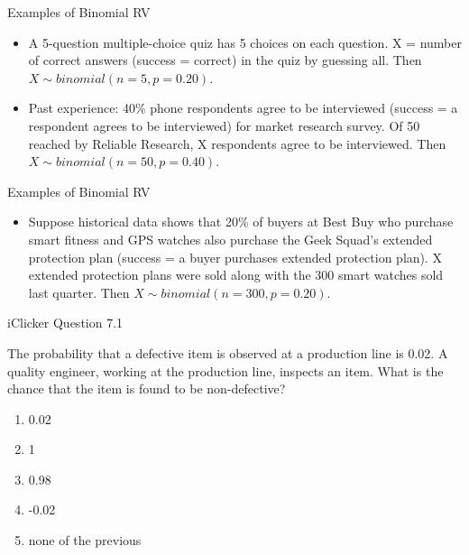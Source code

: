 \documentclass[14pt]{beamer}\usepackage[]{graphicx}\usepackage[]{color}
\begin{document}
\begin{frame}[fragile]{Examples of Binomial RV}

\begin{itemize}
\item A 5-question multiple-choice quiz has 5 choices on each question.
X = number of correct answers (success = correct) in the quiz by
guessing all.  Then $X \sim binomial( n = 5, p = 0.20)$.

\item Past experience: 40\% phone respondents agree to be interviewed  (success = a respondent agrees to be interviewed) for market  research survey. Of 50 reached by Reliable Research, X respondents agree to be interviewed. Then
$X \sim binomial(n = 50, p = 0.40)$.

\end{itemize}
\end{frame}

\begin{frame}[fragile]{Examples of Binomial RV}

\begin{itemize}

\item Suppose historical data shows that 20\% of buyers at Best Buy who purchase smart fitness and GPS watches also purchase the Geek Squad’s extended protection plan (success = a buyer purchases extended protection plan). X extended protection plans were sold along with the 300 smart watches sold last quarter. Then $X \sim binomial(n = 300, p = 0.20)$.

\end{itemize}
\end{frame}

\begin{frame}[fragile]{iClicker Question 7.1}

The probability that a defective item is observed at a production line  is 0.02. A quality engineer, working at the production line, inspects  an item. What is the chance that the item is found to be non-defective?

\begin{enumerate}
\item 0.02
\item 1
\item 0.98
\item -0.02
\item none of the previous
\end{enumerate}
\end{frame}
\end{document}
